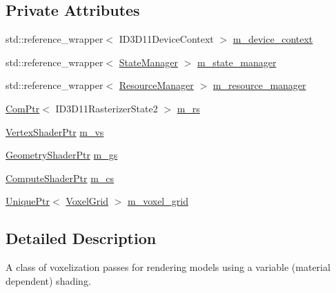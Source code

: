 \subsection*{Private Attributes}
\begin{DoxyCompactItemize}
\item 
std\+::reference\+\_\+wrapper$<$ I\+D3\+D11\+Device\+Context $>$ \mbox{\hyperlink{classmage_1_1rendering_1_1_voxelization_pass_a44fc5652aed364651c7f58db658fc951}{m\+\_\+device\+\_\+context}}
\item 
std\+::reference\+\_\+wrapper$<$ \mbox{\hyperlink{classmage_1_1rendering_1_1_state_manager}{State\+Manager}} $>$ \mbox{\hyperlink{classmage_1_1rendering_1_1_voxelization_pass_a449470bf0e0a246a2457b87289155330}{m\+\_\+state\+\_\+manager}}
\item 
std\+::reference\+\_\+wrapper$<$ \mbox{\hyperlink{classmage_1_1rendering_1_1_resource_manager}{Resource\+Manager}} $>$ \mbox{\hyperlink{classmage_1_1rendering_1_1_voxelization_pass_aadfa94217df7498078ae49effc6b438b}{m\+\_\+resource\+\_\+manager}}
\item 
\mbox{\hyperlink{namespacemage_ae74f374780900893caa5555d1031fd79}{Com\+Ptr}}$<$ I\+D3\+D11\+Rasterizer\+State2 $>$ \mbox{\hyperlink{classmage_1_1rendering_1_1_voxelization_pass_a0b92de6ef466e697204af0bc5907fcc8}{m\+\_\+rs}}
\item 
\mbox{\hyperlink{namespacemage_1_1rendering_aaf704b9c54a4181f4950a1761de69dda}{Vertex\+Shader\+Ptr}} \mbox{\hyperlink{classmage_1_1rendering_1_1_voxelization_pass_aa95ee5cba6cfdf82d115f080421aee1c}{m\+\_\+vs}}
\item 
\mbox{\hyperlink{namespacemage_1_1rendering_aa5d63f80f9483d0896718813768ba1cf}{Geometry\+Shader\+Ptr}} \mbox{\hyperlink{classmage_1_1rendering_1_1_voxelization_pass_ac6161a5ea8a4203c4026afecf90755d4}{m\+\_\+gs}}
\item 
\mbox{\hyperlink{namespacemage_1_1rendering_ab3dc9f2114f2e9255b91d9c051da52ea}{Compute\+Shader\+Ptr}} \mbox{\hyperlink{classmage_1_1rendering_1_1_voxelization_pass_ae3d844f54f0a3c1e2949b8cb38836eeb}{m\+\_\+cs}}
\item 
\mbox{\hyperlink{namespacemage_a3316d7143a973e37adf1110f2e80ca31}{Unique\+Ptr}}$<$ \mbox{\hyperlink{classmage_1_1rendering_1_1_voxel_grid}{Voxel\+Grid}} $>$ \mbox{\hyperlink{classmage_1_1rendering_1_1_voxelization_pass_a5263939327363598c9d628db79b3cc49}{m\+\_\+voxel\+\_\+grid}}
\end{DoxyCompactItemize}


\subsection{Detailed Description}
A class of voxelization passes for rendering models using a variable (material dependent) shading. 

